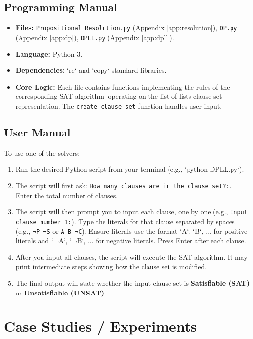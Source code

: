 \documentclass[11pt, a4paper]{article}
\begin{document}
\subsection*{Programming Manual}
\begin{itemize}
    \item \textbf{Files:} \texttt{Propositional Resolution.py} (Appendix \ref{app:resolution}), \texttt{DP.py} (Appendix \ref{app:dp}), \texttt{DPLL.py} (Appendix \ref{app:dpll}).
    \item \textbf{Language:} Python 3.
    \item \textbf{Dependencies:} `re` and `copy` standard libraries.
    \item \textbf{Core Logic:} Each file contains functions implementing the rules of the corresponding SAT algorithm, operating on the list-of-lists clause set representation. The \texttt{create\_clause\_set} function handles user input. %
\end{itemize}

\subsection*{User Manual}
To use one of the solvers:
\begin{enumerate}
    \item Run the desired Python script from your terminal (e.g., `python DPLL.py`).
    \item The script will first ask: \texttt{How many clauses are in the clause set?:}. Enter the total number of clauses.
    \item The script will then prompt you to input each clause, one by one (e.g., \texttt{Input clause number 1:}). Type the literals for that clause separated by spaces (e.g., \texttt{¬P ¬S} or \texttt{A B ¬C}). Ensure literals use the format `A`, `B`, ... for positive literals and `¬A`, `¬B`, ... for negative literals. Press Enter after each clause.
    \item After you input all clauses, the script will execute the SAT algorithm. It may print intermediate steps showing how the clause set is modified.
    \item The final output will state whether the input clause set is \textbf{Satisfiable (SAT)} or \textbf{Unsatisfiable (UNSAT)}.
\end{enumerate}

\section{Case Studies / Experiments} \label{sec:casestudies}
\end{document}
